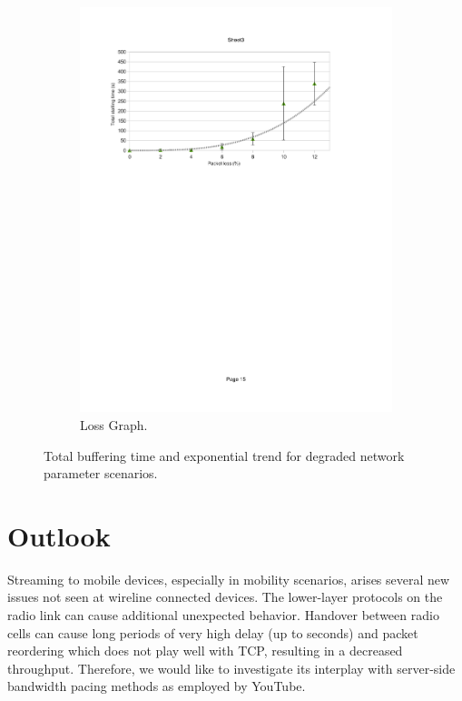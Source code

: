 \begin{figure}
\begin{subfigure}[b]{0.50\textwidth}
                \includegraphics[width=\textwidth]{images/streaming/loss.pdf}
                \caption{Loss Graph.}
                \label{fig:lossseries}
        \end{subfigure}
\caption{Total buffering time and exponential trend for degraded network parameter scenarios.}
\label{fig:seriesgraphs}
\end{figure}


\section{Outlook}
\label{sec:outlook}

Streaming to mobile devices, especially in mobility scenarios, arises several new issues not seen at wireline connected devices. The lower-layer protocols on the radio link can cause additional unexpected behavior. Handover between radio cells can cause long periods of very high delay (up to seconds) and packet reordering which does not play well with TCP, resulting in a decreased throughput. Therefore, we would like to investigate its interplay with server-side bandwidth pacing methods as employed by YouTube.

